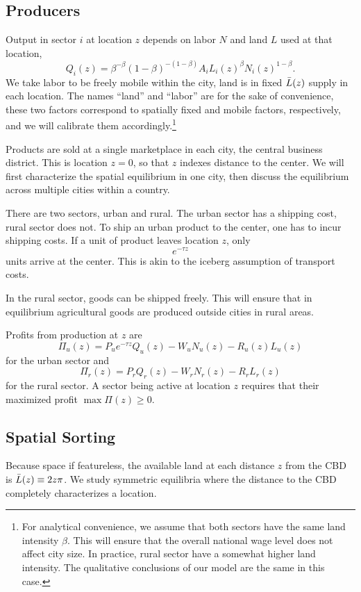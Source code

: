 \documentclass[12pt]{article}
\begin{document}
\subsection{Producers}
Output in sector $i$ at location $z$ depends on labor $N$ and land $L$ used at that location,
\[
Q_i(z) =\beta^{-\beta}(1-\beta)^{-(1-\beta)} A_i L_i(z)^{\beta}N_i(z)^{1-\beta}.
\]
We take labor to be freely mobile within the city, land is in fixed $\Bar{L}(z)$ supply in each location. The names ``land'' and ``labor'' are for the sake of convenience, these two factors correspond to spatially fixed and mobile factors, respectively, and we will calibrate them accordingly.\footnote{For analytical convenience, we assume that both sectors have the same land intensity $\beta$. This will ensure that the overall national wage level does not affect city size. In practice, rural sector have a somewhat higher land intensity. The qualitative conclusions of our model are the same in this case.}

Products are sold at a single marketplace in each city, the central business district. This is location $z=0$, so that $z$ indexes distance to the center. We will first characterize the spatial equilibrium in one city, then discuss the equilibrium across multiple cities within a country.

There are two sectors, urban and rural. The urban sector has a shipping cost, rural sector does not.
To ship an urban product to the center, one has to incur shipping costs. If a unit of product leaves location $z$, only
\[
e^{-\tau z}
\]
units arrive at the center. This is akin to the iceberg assumption of transport costs.

In the rural sector, goods can be shipped freely. This will ensure that in equilibrium agricultural goods are produced outside cities in rural areas.

Profits from production at $z$ are
\begin{equation}
\label{eq:profit}
\Pi_u(z)=P_ue^{-\tau z}Q_u(z)-W_uN_u(z)-R_u(z)L_u(z)
\end{equation}
for the urban sector and
\begin{equation}
\label{eq:profit:rural}
\Pi_r(z)=P_r Q_r(z)-W_rN_r(z)-R_rL_r(z)
\end{equation}
for the rural sector. A sector being active at location $z$ requires that their maximized profit $\max\Pi(z)\geq0$.

\subsection{Spatial Sorting}
Because space if featureless, the available land at each distance $z$ from the CBD is $\Bar L(z) \equiv 2z\pi$. We study symmetric equilibria where the distance to the CBD completely characterizes a location.
\end{document}
